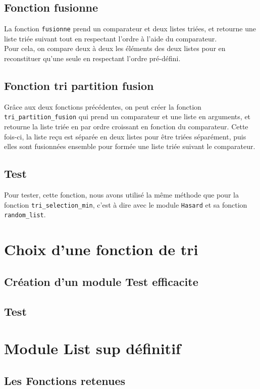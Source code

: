 \documentclass[a4paper, 11pt]{article}
\begin{document}
\subsection{Fonction fusionne}
La fonction \texttt{fusionne} prend un comparateur et deux listes triées, et retourne une liste triée suivant tout en respectant l'ordre à l'aide du comparateur.\\
Pour cela, on compare deux à deux les éléments des deux listes pour en reconstituer qu'une seule en respectant l'ordre pré-défini.
\subsection{Fonction tri partition fusion}
Grâce aux deux fonctions précédentes, on peut créer la fonction \texttt{tri\_partition\_fusion} qui prend un comparateur et une liste en arguments, et retourne la liste triée en par ordre croissant en fonction du comparateur. Cette fois-ci, la liste reçu est séparée en deux listes pour être triées séparément, puis elles sont fusionnées ensemble pour formée une liste triée suivant le comparateur.
\subsection{Test}
Pour tester, cette fonction, nous avons utilisé la même méthode que pour la fonction \texttt{tri\_selection\_min}, c'est à dire avec le module \texttt{Hasard} et sa fonction \texttt{random\_list}.
\section{Choix d'une fonction de tri}
\subsection{Création d'un module Test efficacite}

\subsection{Test}


\section{Module List sup définitif}
\subsection{Les Fonctions retenues}
\end{document}

